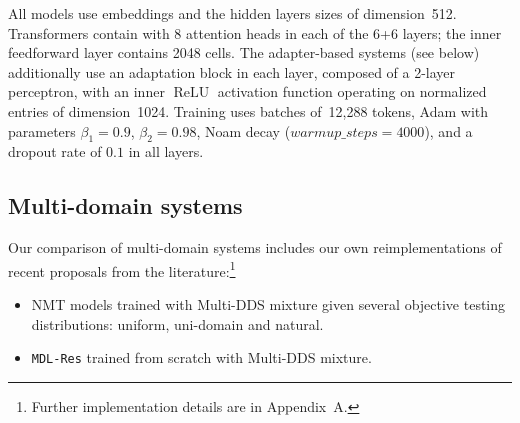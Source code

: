 \documentclass[11pt,a4paper]{article}
\newcommand{\revision}[1]{#1}
\newcommand{\system}[1]{\texttt{{#1}}}
\begin{document}
All models use embeddings and the hidden layers sizes of dimension~512. Transformers contain with 8 attention heads in each of the 6+6 layers; the inner feedforward layer contains 2048 cells. The adapter-based systems (see below) additionally use an adaptation block in each layer, composed of a 2-layer perceptron, with an inner $\operatorname{ReLU}$ activation function operating on normalized entries of dimension~1024. 
Training uses batches of~12,288 tokens, Adam with parameters $\beta_1=0.9$, $\beta_2= 0.98$, Noam decay ($warmup\_steps=4000$), and a dropout rate of $0.1$ in all layers.
\subsection{Multi-domain systems} \label{ssec:mdsys}
Our comparison of multi-domain systems includes our own reimplementations of recent proposals from the literature:\footnote{\revision{Further implementation details are in Appendix~A.}}
\begin{itemize}
\itemsep0em 
\item NMT models trained with Multi-DDS mixture given several objective testing distributions: uniform, uni-domain and natural.
\item \system{MDL-Res} trained from scratch with Multi-DDS mixture.
\end{itemize}
\end{document}
